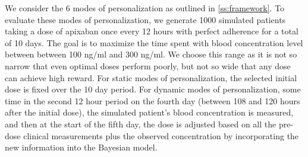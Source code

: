 
We consider the 6 modes of personalization as outlined in \cref{ss:framework}.  To evaluate these modes of personalization, we generate 1000 simulated patients taking a dose of apixaban once every 12 hours with perfect adherence for a total of 10 days. The goal is to maximize the time spent with blood concentration level between between 100 ng/ml and 300 ng/ml. We choose this range as it is not so narrow that even optimal doses perform poorly, but not so wide that any dose can achieve high reward. For static modes of personalization, the selected initial dose is fixed over the 10 day period. For dynamic modes of personalization, some time in the second 12 hour period on the fourth day (between 108 and 120 hours after the initial dose), the simulated patient's blood concentration is measured, and then at the start of the fifth day, the dose is adjusted based on all the pre-dose clinical measurements plus the observed concentration by incorporating the new information into the Bayesian model. 

